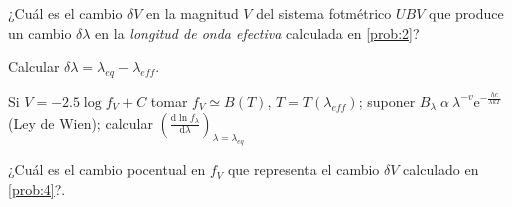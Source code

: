 \documentclass[12pt,a4paper]{practice}
\begin{document}
    \begin{problem}\label{prob:4}
        ¿Cuál es el cambio $\delta V$ en la magnitud $V$ del sistema fotmétrico $UBV$ que produce un cambio $\delta\lambda$ en la \emph{longitud de onda efectiva} calculada en \ref{prob:2}?

        Calcular $\delta\lambda = {\lambda}_{eq} - {\lambda}_{eff}$.

        \begin{recommendation}
            Si $V = -2.5 \log f_V + C$ tomar $f_V \simeq B\left(T\right) $, $T=T\left({\lambda}_{eff}\right)$; suponer $B_{\lambda}\ \alpha\ {\lambda}^{-v} \mathrm{e}^{-\frac{hc}{\lambda k T}}$ (Ley de Wien); calcular $\left(\frac{\mathrm{d} \ln {f}_{\lambda}}{\mathrm{d}\lambda}\right)_{\lambda = {\lambda}_{eq}}$
        \end{recommendation}
    \end{problem}

    \begin{problem}\label{prob:5}
        ¿Cuál es el cambio pocentual en $f_V$ que representa el cambio $\delta V$ calculado en \ref{prob:4}?.
    \end{problem}
\end{document}
